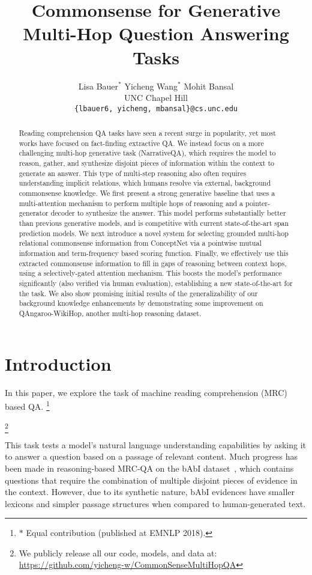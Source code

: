 \documentclass[11pt,a4paper]{article}
\title{Commonsense for Generative Multi-Hop Question Answering Tasks}
\author{Lisa Bauer$^*$ \;\;\;\;\;\;\; Yicheng Wang$^*$ \;\;\;\;\;\;\; Mohit Bansal \\
  UNC Chapel Hill \\
  {\tt \{lbauer6, yicheng, mbansal\}@cs.unc.edu} \\
 }
\date{}
\newcommand\blfootnote[1]{\begingroup
  \renewcommand\thefootnote{}\footnote{#1}\addtocounter{footnote}{-1}\endgroup
}
\begin{document}
\maketitle
\begin{abstract}

Reading comprehension QA tasks have seen a recent surge in popularity, yet most works have focused on fact-finding extractive QA. We instead focus on a more challenging multi-hop generative task (NarrativeQA), which requires the model to reason, gather, and synthesize disjoint pieces of information within the context to generate an answer.
This type of multi-step reasoning also often requires understanding implicit relations, which humans resolve via  external, background commonsense knowledge.
We first present a strong generative baseline that uses a multi-attention mechanism to perform multiple hops of reasoning and a pointer-generator decoder to synthesize the answer. This model performs substantially better than previous generative models, and is competitive with current state-of-the-art span prediction models. We next introduce a novel system for selecting grounded multi-hop relational commonsense information from ConceptNet via a pointwise mutual information and term-frequency based scoring function.
Finally, we effectively use this extracted commonsense information to fill in gaps of reasoning between context hops, using a selectively-gated attention mechanism.
This boosts the model's performance significantly (also verified via human evaluation), establishing a new state-of-the-art for the task. 
We also show promising initial results of the generalizability of our background knowledge enhancements by demonstrating some improvement on QAngaroo-WikiHop, another multi-hop reasoning dataset.


\end{abstract}

\section{Introduction}
In this paper, we explore the task of machine reading comprehension (MRC) based QA.\blfootnote{$*$ Equal contribution (published at EMNLP 2018).}\blfootnote{We publicly release all our code, models, and data at: \scriptsize{\url{https://github.com/yicheng-w/CommonSenseMultiHopQA}}}
This task tests a model's natural language understanding capabilities by asking it to answer a question based on a passage of relevant content.
Much progress has been made in reasoning-based MRC-QA on the bAbI dataset~\cite{Babi},
which contains questions that require
the combination of multiple disjoint pieces of evidence in the context.
However, due to its synthetic nature, bAbI evidences have smaller lexicons and simpler passage structures when compared to human-generated text.
\end{document}
